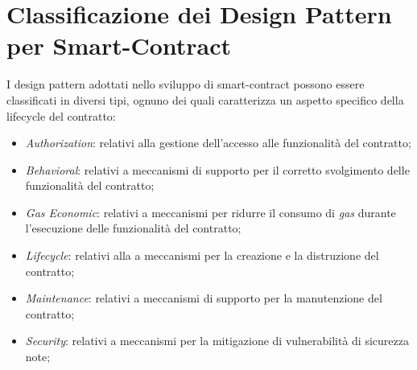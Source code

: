 \chapter{Classificazione dei Design Pattern per Smart-Contract}
I design pattern adottati nello sviluppo di smart-contract possono essere classificati in diversi tipi\cite[alcuni tipi]{9089272}\cite{9050163}, ognuno dei quali caratterizza un aspetto specifico della lifecycle del contratto:

\begin{itemize}
	\item \textit{Authorization}: relativi alla gestione dell'accesso alle funzionalità del contratto;
	\item \textit{Behavioral}: relativi a meccanismi di supporto per il corretto svolgimento delle funzionalità del contratto;
	\item \textit{Gas Economic}: relativi a meccanismi per ridurre il consumo di \textit{gas} durante l'esecuzione delle funzionalità del contratto;
	\item \textit{Lifecycle}: relativi alla a meccanismi per la creazione e la distruzione del contratto;
	\item \textit{Maintenance}: relativi a meccanismi di supporto per la manutenzione del contratto;
	\item \textit{Security}: relativi a meccanismi per la mitigazione di vulnerabilità di sicurezza note;
\end{itemize}

